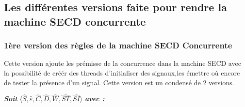 \documentclass[10pt,a4paper]{article}
\begin{document}
			\subsection{Les différentes versions faite pour rendre la machine SECD concurrente}
				\subsubsection{1ère version des règles de la machine SECD Concurrente}\label{SECDConc1}
					\smallbreak
					Cette version ajoute les prémisse de la concurrence dans la machine SECD avec la possibilité de créér des threads d'initialiser des signaux,les émettre où encore de tester la présence d'un signal. Cette version est un condensé de 2 versions.
					\bigbreak
					
					\textbf{\textit{Soit}} $\langle\widehat{S},\widehat{\varepsilon},\widehat{C},\widehat{D},\widehat{W},\widehat{ST},\widehat{SI}\rangle$ \textbf{\textit{avec :}}
					
\end{document}
